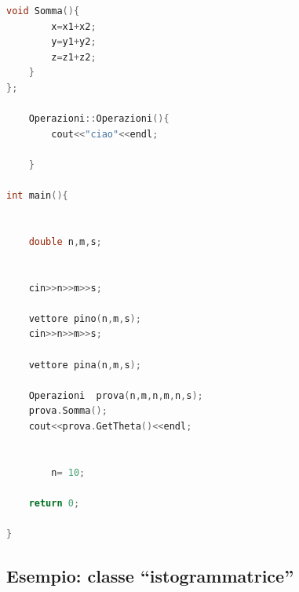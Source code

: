 \documentclass[11pt,fleqn]{book} %
\begin{document}
\begin{lstlisting}[language=c++]
    void Somma(){
        x=x1+x2;
        y=y1+y2;
        z=z1+z2;
    }
};

    Operazioni::Operazioni(){
        cout<<"ciao"<<endl;
        
    }

int main(){
   
    
    double n,m,s;
    
    
    cin>>n>>m>>s;

    vettore pino(n,m,s);
    cin>>n>>m>>s;

    vettore pina(n,m,s);
    
    Operazioni  prova(n,m,n,m,n,s);
    prova.Somma();
    cout<<prova.GetTheta()<<endl;
    
  
        n= 10;
    
    return 0;
    
}

\end{lstlisting}

\subsection{Esempio: classe ``istogrammatrice''}
\end{document}
